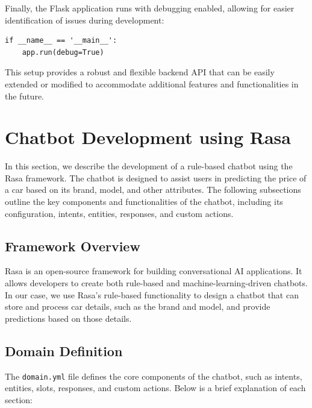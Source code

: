 \documentclass[a4paper,12pt]{article}
\begin{document}
\begin{justify}
Finally, the Flask application runs with debugging enabled, allowing for easier identification of issues during development:

\begin{verbatim}
if __name__ == '__main__':
    app.run(debug=True)
\end{verbatim}

This setup provides a robust and flexible backend API that can be easily extended or modified to accommodate additional features and functionalities in the future.


\end{justify}

\section{Chatbot Development using Rasa}
In this section, we describe the development of a rule-based chatbot using the Rasa framework. The chatbot is designed to assist users in predicting the price of a car based on its brand, model, and other attributes. The following subsections outline the key components and functionalities of the chatbot, including its configuration, intents, entities, responses, and custom actions.

\subsection{Framework Overview}
Rasa is an open-source framework for building conversational AI applications. It allows developers to create both rule-based and machine-learning-driven chatbots. In our case, we use Rasa's rule-based functionality to design a chatbot that can store and process car details, such as the brand and model, and provide predictions based on those details.

\subsection{Domain Definition}
The \texttt{domain.yml} file defines the core components of the chatbot, such as intents, entities, slots, responses, and custom actions. Below is a brief explanation of each section:
\end{document}
